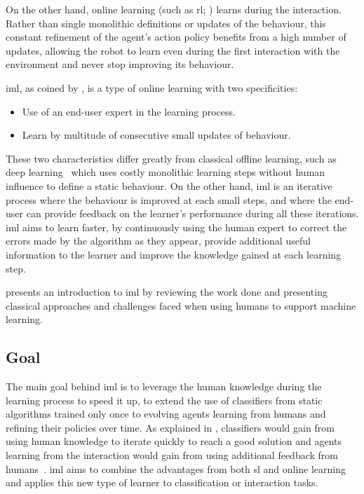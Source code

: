 On the other hand, online learning (such as \gls{rl}; \citealt{sutton1998reinforcement}) learns during the interaction. Rather than single monolithic definitions or updates of the behaviour, this constant refinement of the agent's action policy benefits from a high number of updates, allowing the robot to learn even during the first interaction with the environment and never stop improving its behaviour.

\acrfull{iml}, as coined by \cite{fails2003interactive}, is a type of online learning with two specificities:
\begin{itemize}
	\item Use of an end-user expert in the learning process.
	\item Learn by multitude of consecutive small updates of behaviour.
\end{itemize}
These two characteristics differ greatly from classical offline learning, such as deep learning~\citep{lecun2015deep} which uses costly monolithic learning steps without human influence to define a static behaviour. On the other hand, \gls{iml} is an iterative process where the behaviour is improved at each small steps, and where the end-user can provide feedback on the learner's performance during all these iterations. \gls{iml} aims to learn faster, by continuously using the human expert to correct the errors made by the algorithm as they appear, provide additional useful information to the learner and improve the knowledge gained at each learning step.

\cite{amershi2014power} presents an introduction to \gls{iml} by reviewing the work done and presenting classical approaches and challenges faced when using humans to support machine learning.

\subsection{Goal}

The main goal behind \gls{iml} is to leverage the human knowledge during the learning process to speed it up, to extend the use of classifiers from static algorithms trained only once to evolving agents learning from humans and refining their policies over time. As explained in \cite{fails2003interactive}, classifiers would gain from using human knowledge to iterate quickly to reach a good solution and agents learning from the interaction would gain from using additional feedback from humans~\citep{thomaz2008teachable,knox2009interactively}. \gls{iml} aims to combine the advantages from both \gls{sl} and online learning and applies this new type of learner to classification or interaction tasks.

